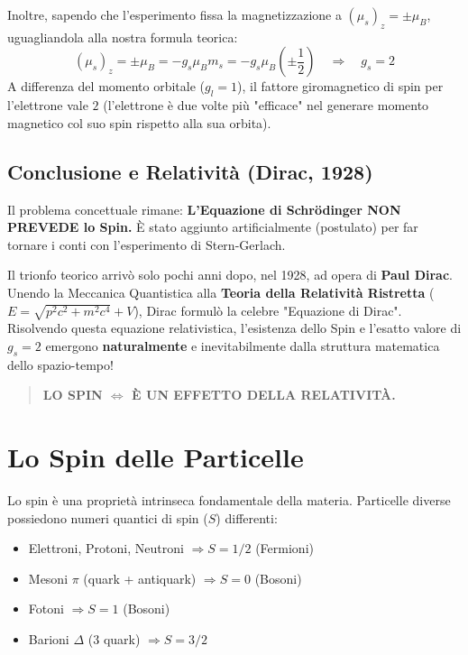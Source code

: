 \documentclass[11pt, a4paper]{article}
\begin{document}
\noindent
Inoltre, sapendo che l'esperimento fissa la magnetizzazione a $(\mu_s)_z = \pm \mu_B$, uguagliandola alla nostra formula teorica: %
\begin{equation}
    (\mu_s)_z = \pm \mu_B = -g_s \mu_B m_s = -g_s \mu_B \left(\pm \frac{1}{2}\right) \quad \Rightarrow \quad \boxed{ g_s = 2 } %
\end{equation}
A differenza del momento orbitale ($g_l = 1$), il fattore giromagnetico di spin per l'elettrone vale $2$ (l'elettrone è due volte più "efficace" nel generare momento magnetico col suo spin rispetto alla sua orbita). %

\subsection{Conclusione e Relatività (Dirac, 1928)} %

Il problema concettuale rimane: \textbf{L'Equazione di Schrödinger NON PREVEDE lo Spin.} È stato aggiunto artificialmente (postulato) per far tornare i conti con l'esperimento di Stern-Gerlach. %

\noindent
Il trionfo teorico arrivò solo pochi anni dopo, nel 1928, ad opera di \textbf{Paul Dirac}. %
Unendo la Meccanica Quantistica alla \textbf{Teoria della Relatività Ristretta} ($E = \sqrt{p^2 c^2 + m^2 c^4} + V$), Dirac formulò la celebre "Equazione di Dirac". 
Risolvendo questa equazione relativistica, l'esistenza dello Spin e l'esatto valore di $g_s=2$ emergono \textbf{naturalmente} e inevitabilmente dalla struttura matematica dello spazio-tempo! %

\begin{quote}
    \textbf{LO SPIN $\Leftrightarrow$ È UN EFFETTO DELLA RELATIVITÀ.} %
\end{quote}

\section{Lo Spin delle Particelle} %

Lo spin è una proprietà intrinseca fondamentale della materia. Particelle diverse possiedono numeri quantici di spin ($S$) differenti: %
\begin{itemize}
    \item Elettroni, Protoni, Neutroni $\Rightarrow S = 1/2$ (Fermioni) %
    \item Mesoni $\pi$ (quark + antiquark) $\Rightarrow S = 0$ (Bosoni) %
    \item Fotoni $\Rightarrow S = 1$ (Bosoni) %
    \item Barioni $\Delta$ (3 quark) $\Rightarrow S = 3/2$ %
\end{itemize}
\end{document}
